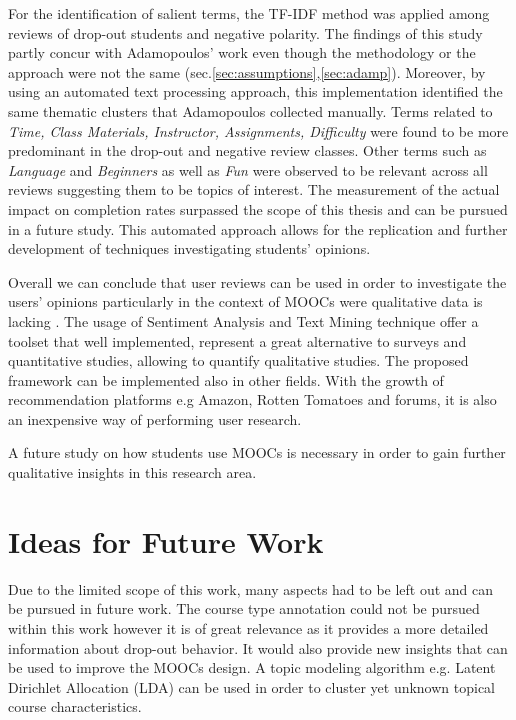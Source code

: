 \documentclass[
	a4paper,
	pdftex,
	12pt,	
	footinclude=true,
	fleqn,
	final,
	]{report}%
\begin{document}
For the identification of salient terms, the TF-IDF method 
was applied among reviews of drop-out students and negative polarity. 
The findings of this study partly concur with Adamopoulos' work even though 
the methodology or the approach were not the same (sec.\ref{sec:assumptions},\ref{sec:adamp}). 
Moreover, by using an automated text processing approach,
this implementation identified the same thematic clusters that 
Adamopoulos collected manually. Terms related to \emph{Time, Class Materials, Instructor, 
Assignments, Difficulty} were found to be more predominant in the drop-out 
and negative review classes. Other terms such as \emph{Language} and \emph{Beginners}
as well as \emph{Fun} were observed to be relevant across all 
reviews suggesting them to be topics of interest. 
The measurement of the actual impact on completion rates 
surpassed the scope of this thesis and can be pursued in a future study. 
This automated approach allows for the replication and further 
development of techniques investigating students' opinions. 

Overall we can conclude that user reviews can be used in order 
to investigate the users' opinions particularly in the context of MOOCs
were qualitative data is lacking \cite{Christensen2013}.
The usage of Sentiment Analysis and Text Mining technique
offer a toolset that well implemented, represent a great 
alternative to surveys and quantitative studies, 
allowing to quantify qualitative studies.
The proposed framework can be implemented also in other fields. 
With the growth of recommendation platforms 
e.g Amazon, Rotten Tomatoes and forums,
it is also an inexpensive way of performing user research.


A future study on how students use MOOCs is necessary 
in order to gain further qualitative insights in this research area. 

\vspace{-0.45cm}
\section*{Ideas for Future Work}
\vspace{-0.3cm}
Due to the limited scope of this work, many aspects had to be left out and can be 
pursued in future work. The course type annotation could not be pursued within this 
work however it is of great relevance as it provides a more detailed information about 
drop-out behavior. It would also provide new insights that can be used to 
improve the MOOCs design. A topic modeling algorithm e.g.  Latent Dirichlet 
Allocation (LDA) can be used in order to cluster yet unknown topical 
course characteristics.
\end{document}
